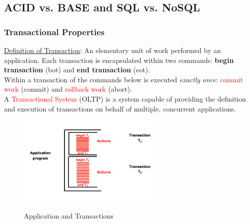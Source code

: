 \documentclass[10pt,a4paper]{article}
\begin{document}
\subsection{ACID vs. BASE and SQL vs. NoSQL}
\subsubsection{Transactional Properties}
\uline{Definition of Transaction}: An elementary unit of work performed by an application. Each transaction is encapsulated within two commands: \textbf{begin transaction} (bot) and \textbf{end transaction} (eot).
\\ Within a transaction of the commands below is executed \textit{exactly once}:
\textcolor{red}{commit work} (commit) and \textcolor{red}{rollback work} (abort). \\
A \textcolor{red}{Transactional System} (OLTP) is a system capable of providing the definition and execution of transactions on behalf of multiple, concurrent applications.
\begin{figure}[h!]
 \hfill \includegraphics[width=200pt]{images/transactions.png}\hspace*{\fill}
  \label{fig:transactions}
  \caption{Application and Transactions}
\end{figure}
\end{document}
